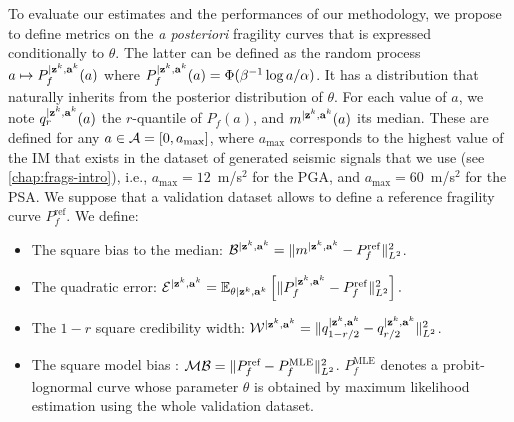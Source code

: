 To evaluate our estimates and the performances of our methodology, we propose to define metrics on the \emph{a posteriori} fragility curves that is expressed conditionally to $\theta$.
The latter can be defined as the
random process $a\mapsto P_f^{|\mathbf{z}^k,\mathbf{a}^k}(a)$ where  $P_f^{|\mathbf{z}^k,\mathbf{a}^k}(a)=\Phi(\beta^{-1}\log a/\alpha)$. It has a distribution that naturally inherits from the posterior distribution of $\theta$.
For each value of $a$, we note $q_r^{|\mathbf{z}^k,\mathbf{a}^k}(a)$ the $r$-quantile of $P_f(a)$, and $m^{|\mathbf{z}^k,\mathbf{a}^k}(a)$ its median.
These are defined for any $a\in\mathcal{A}=[0,a_{\text{max}}]$, where $a_{\text{max}}$ corresponds to the highest value of the IM that exists in the dataset of generated seismic signals that we use (see \cref{chap:frags-intro}), i.e.,
$a_{\text{max}}=12$~m/s$^2$ for the PGA, and  $a_{\text{max}}=60$~m/s$^2$ for the PSA.
We suppose that a validation dataset allows to define a reference fragility curve $P_f^{\text{ref}}$. We define:
\begin{itemize}
    \item The square bias to the median: $\mathcal{B}^{|\mathbf{z}^k,\mathbf{a}^k} = \|m^{|\mathbf{z}^k,\mathbf{a}^k}- P_f^{\mathrm{ref}}\|^2_{L^2}$. %
    \item The quadratic error: $\mathcal{E}^{|\mathbf{z}^k,\mathbf{a}^k}=\mathbb{E}_{\theta|\mathbf{z}^k,\mathbf{a}^k}\left[\|P_f^{|\mathbf{z}^k,\mathbf{a}^k}-P_f^{\mathrm{ref}} \|^2_{L^2}\right].$
    \item The $1-r$ square credibility width: $\mathcal{W}^{|\mathbf{z}^k,\mathbf{a}^k}= \|q_{1-{r/2}}^{|\mathbf{z}^k,\mathbf{a}^k} - q_{{r/2}}^{|\mathbf{z}^k,\mathbf{a}^k}\|_{L^2}^2$.
    \item {The square model bias :  $\mathcal{M}\mathcal{B} = \|P_f^{\text{ref}}-P_f^{\text{MLE}}\|_{L^2}^2$. $P_f^{\text{MLE}}$ denotes a probit-lognormal curve whose parameter $\theta$ is obtained by maximum likelihood estimation using the whole validation dataset.}
\end{itemize}

